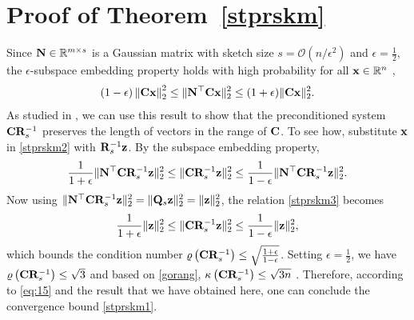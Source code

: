 \documentclass[12pt,draftcls,onecolumn]{IEEEtran}
\begin{document}
\section{Proof of Theorem~\ref{stprskm}}
\label{ak}
Since $\mathbf{N}\in\mathbb{R}^{m\times s}$ is a Gaussian matrix with sketch size $s=\mathcal{O}\left(n/\epsilon^{2}\right)$ and $\epsilon=\frac{1}{2}$, the $\epsilon$-subspace embedding property holds with high probability for all $\mathbf{x}\in\mathbb{R}^{n}$ \cite{martinsson2020randomized},
\begin{equation}
\label{stprskm2}
\left(1-\epsilon\right)\left\|\mbC\mbx\right\|_{2}^{2}\leq\|\mbN^{\top}\mbC\mbx\|_{2}^{2}\leq (1+\epsilon)\|\mbC\mbx\|_{2}^{2}.
\end{equation}
As studied in \cite{martinsson2020randomized}, we can use this result to show that the preconditioned system $\mathbf{C}\mathbf{R}_{s}^{-1}$ preserves the length of vectors in the range of $\mathbf{C}$. To see how, substitute $\mathbf{x}$ in \eqref{stprskm2} with $\mathbf{R}_{s}^{-1}\mathbf{z}$. By the subspace embedding property,
\begin{equation}
\label{stprskm3}
\frac{1}{1+\epsilon}\|\mbN^{\top}\mbC\mbR_{s}^{-1}\mbz\|_{2}^{2}\leq\|\mbC\mbR_{s}^{-1}\mbz\|_{2}^{2}\leq\frac{1}{1-\epsilon}\|\mbN^{\top}\mbC\mbR_{s}^{-1}\mbz\|_{2}^{2}.
\end{equation}
Now using $\|\mathbf{N}^{\top}\mathbf{C}\mathbf{R}_{s}^{-1}\mathbf{z}\|_{2}^{2}=\|\mathbf{Q}_{s}\mathbf{z}\|_{2}^{2}=\|\mathbf{z}\|_{2}^{2}$, the relation \eqref{stprskm3} becomes
\begin{equation}
\label{stprskm4}
\frac{1}{1+\epsilon}\|\mbz\|_{2}^{2}\leq\|\mbC\mbR_{s}^{-1}\mbz\|_{2}^{2}\leq\frac{1}{1-\epsilon}\|\mbz\|_{2}^{2},
\end{equation}
which bounds the condition number $\varrho\left(\mathbf{C}\mathbf{R}_{s}^{-1}\right)\leq\sqrt{\frac{1+\epsilon}{1-\epsilon}}$. Setting $\epsilon=\frac{1}{2}$, we have $\varrho\left(\mathbf{C}\mathbf{R}_{s}^{-1}\right)\leq\sqrt{3}$ and based on \eqref{gorang}, $\kappa\left(\mathbf{C}\mathbf{R}_{s}^{-1}\right)\leq \sqrt{3n}$ . Therefore, according to \eqref{eq:15}
and the result that we have obtained here, one can conclude the convergence bound \eqref{stprskm1}.
\end{document}
